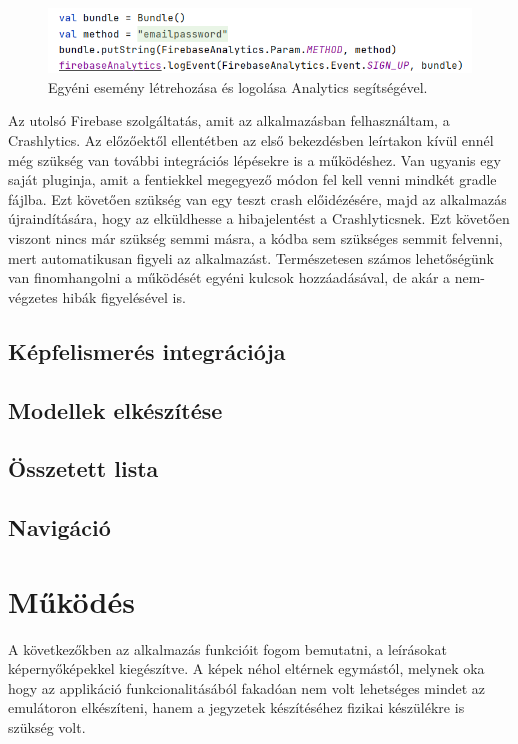 \begin{figure}[!ht]
	\centering
	\includegraphics[width=120mm, keepaspectratio]{figures/analytics_custom.png}
	\caption{Egyéni esemény létrehozása és logolása Analytics segítségével.}
	\label{fig:Analytics}
\end{figure}

Az utolsó Firebase szolgáltatás, amit az alkalmazásban felhasználtam, a Crashlytics. Az előzőektől ellentétben az első bekezdésben leírtakon kívül ennél még szükség van további integrációs lépésekre is a működéshez. Van ugyanis egy saját pluginja, amit a fentiekkel megegyező módon fel kell venni mindkét gradle fájlba. Ezt követően szükség van egy teszt crash előidézésére, majd az alkalmazás újraindítására, hogy az elküldhesse a hibajelentést a Crashlyticsnek. Ezt követően viszont nincs már szükség semmi másra, a kódba sem szükséges semmit felvenni, mert automatikusan figyeli az alkalmazást. Természetesen számos lehetőségünk van finomhangolni a működését egyéni kulcsok hozzáadásával, de akár a nem-végzetes hibák figyelésével is.

\subsection{Képfelismerés integrációja}

\subsection{Modellek elkészítése} 

\subsection{Összetett lista}

\subsection{Navigáció}

\section{Működés}

A következőkben az alkalmazás funkcióit fogom bemutatni, a leírásokat képernyőképekkel kiegészítve. A képek néhol eltérnek egymástól, melynek oka hogy az applikáció funkcionalitásából fakadóan nem volt lehetséges mindet az emulátoron elkészíteni, hanem a jegyzetek készítéséhez fizikai készülékre is szükség volt.

